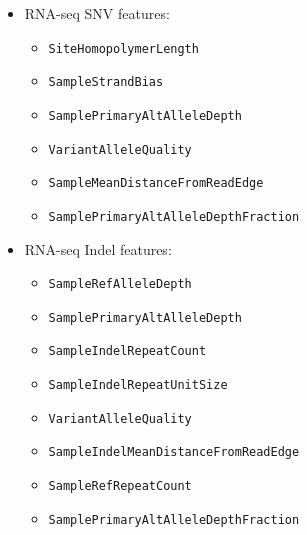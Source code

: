 \documentclass{article}
\begin{document}
\begin{itemize}
    \item RNA-seq SNV features:
    \begin{itemize}
        \item \texttt{SiteHomopolymerLength}
        \item \texttt{SampleStrandBias}
        \item \texttt{SamplePrimaryAltAlleleDepth}
        \item \texttt{VariantAlleleQuality}
        \item \texttt{SampleMeanDistanceFromReadEdge}
        \item \texttt{SamplePrimaryAltAlleleDepthFraction}
    \end{itemize}
    \item RNA-seq Indel features:
    \begin{itemize}
        \item \texttt{SampleRefAlleleDepth}
        \item \texttt{SamplePrimaryAltAlleleDepth}
        \item \texttt{SampleIndelRepeatCount}
        \item \texttt{SampleIndelRepeatUnitSize}
        \item \texttt{VariantAlleleQuality}
        \item \texttt{SampleIndelMeanDistanceFromReadEdge}
        \item \texttt{SampleRefRepeatCount}
        \item \texttt{SamplePrimaryAltAlleleDepthFraction}
    \end{itemize}


\end{itemize}
\end{document}
